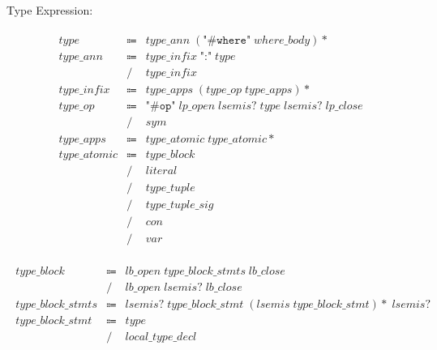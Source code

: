 Type Expression:

\begin{align*}
    \begin{array}{rcll}
        \mathit{type}
        &\Coloneq &\mathit{type\_ann}\; (\texttt{"\#where"}\; \mathit{where\_body}){*} \\
        \mathit{type\_ann}
        &\Coloneq &\mathit{type\_infix}\; \texttt{":"}\; \mathit{type} \\
        &\mathrel{/} &\mathit{type\_infix} \\
        \mathit{type\_infix}
        &\Coloneq &\mathit{type\_apps}\; (\mathit{type\_op}\; \mathit{type\_apps}){*} \\
        \mathit{type\_op}
        &\Coloneq &\texttt{"\#op"}\; \mathit{lp\_open}\; \mathit{lsemis}{?}\; \mathit{type}\; \mathit{lsemis}{?}\; \mathit{lp\_close} \\
        &\mathrel{/} &\mathit{sym} \\
        \mathit{type\_apps}
        &\Coloneq &\mathit{type\_atomic}\; \mathit{type\_atomic}{*} \\
        \mathit{type\_atomic}
        &\Coloneq &\mathit{type\_block} \\
        &\mathrel{/} &\mathit{literal} \\
        &\mathrel{/} &\mathit{type\_tuple} \\
        &\mathrel{/} &\mathit{type\_tuple\_sig} \\
        &\mathrel{/} &\mathit{con} \\
        &\mathrel{/} &\mathit{var}
    \end{array}
\end{align*}

\begin{align*}
    \begin{array}{rcll}
        \mathit{type\_block}
        &\Coloneq &\mathit{lb\_open}\; \mathit{type\_block\_stmts}\; \mathit{lb\_close} \\
        &\mathrel{/} &\mathit{lb\_open}\; \mathit{lsemis}{?}\; \mathit{lb\_close} \\
        \mathit{type\_block\_stmts}
        &\Coloneq &\mathit{lsemis}{?}\; \mathit{type\_block\_stmt}\; (\mathit{lsemis}\; \mathit{type\_block\_stmt}){*}\; \mathit{lsemis}{?} \\
        \mathit{type\_block\_stmt}
        &\Coloneq &\mathit{type} \\
        &\mathrel{/} &\mathit{local\_type\_decl}
    \end{array}
\end{align*}

